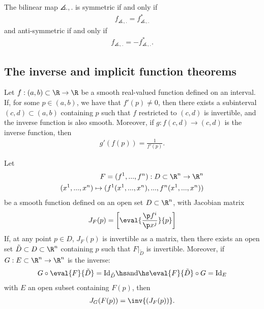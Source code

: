 \documentclass{article}
\begin{document}
\begin{lemma}
	The bilinear map $\angles{.,.}$ is symmetric if and only if
	\begin{align*}
		f_{\angles{.,.}}=f_{\angles{.,.}}^*
	\end{align*}
	and anti-symmetric if and only if
	\begin{align*}
		f_{\angles{.,.}}=-f_{\angles{.,.}}^*.
	\end{align*}
\end{lemma}


\subsection{The inverse and implicit function theorems}

\begin{theorem}
	Let $f:(a,b)\subset \R \to \R$ be a smooth real-valued function defined on an
	interval. If, for some $p\in(a,b)$, we have that $f'(p)\not=0$, then there exists
	a subinterval $(c,d)\subset(a,b)$ containing $p$ such that $f$ restricted to $(c,d)$
	is invertible, and the inverse function is also smooth. Moreover, if
	$g:f(c,d)\to(c,d)$ is the inverse function, then
	\begin{align*}
		g'(f(p))=\frac{1}{f'(p)}.
	\end{align*}
\end{theorem}

\begin{theorem}
	Let
	\begin{align*}
		F = (f^1,...,f^n):D\subset \R^n\to\R^n \\
		(x^1,...,x^n)\mapsto (f^1(x^1,...,x^n), ..., f^n(x^1,...,x^n))
	\end{align*}
	be a smooth function defined on an open set $D\subset\R^n$, with Jacobian matrix
	\begin{align*}
		J_F(p)=\left[\eval{\frac{\p f^i}{\p x^j}}{p}\right]
	\end{align*}
	If, at any point $p\in D$, $J_F(p)$ is invertible as a matrix, then there exists
	an open set $\tilde D\subset D\subset \R^n$ containing $p$ such that $F|_{\tilde D}$
	is invertible.
	Moreover, if $G:E\subset\R^n\to \R^n$ is the inverse:
	\begin{align*}
		G\circ \eval{F}{\tilde D}=\text{Id}_{\tilde D} \hs\text{and}\hs \eval{F}{\tilde D}\circ G=\text{Id}_E
	\end{align*}
	with $E$ an open subset containing $F(p)$, then
	\begin{align*}
		J_G(F(p))=\inv{(J_F(p))}.
	\end{align*}
\end{theorem}
\end{document}
